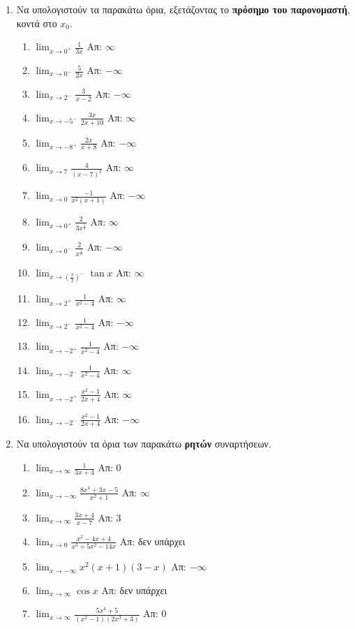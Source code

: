 \begin{enumerate}
  \item Να υπολογιστούν τα παρακάτω όρια, εξετάζοντας το \textbf{πρόσημο του 
    παρονομαστή}, κοντά στο $ x_{0} $.
    \begin{enumerate}
      \item $\lim_{x\to 0^+}\frac{1}{3x}$ \hfill Απ: $\infty$
      \item $\lim_{x\to 0^-}\frac{5}{2x}$ \hfill Απ: $-\infty$
      \item $\lim_{x\to 2^-}\frac{3}{x-2}$ \hfill Απ: $-\infty$
      \item $\lim_{x\to -5^-}\frac{3x}{2x+10}$ \hfill Απ: $\infty$
      \item $\lim_{x\to -8^+}\frac{2x}{x+8}$ \hfill Απ: $-\infty$
      \item $\lim_{x\to 7}\frac{4}{(x-7)^2}$ \hfill Απ: $\infty$
      \item $\lim_{x\to 0}\frac{-1}{x^2(x+1)}$ \hfill Απ: $-\infty$
      \item $\lim_{x\to 0^+}\frac{2}{3x^{\frac{1}{3}}}$ \hfill Απ: $\infty$
      \item $\lim_{x\to 0^-}\frac{2}{x^{\frac{1}{5}}}$ \hfill Απ: $-\infty$
      \item $\lim_{x\to \left(\frac{\pi}{2}\right)^-}\tan x$ \hfill Απ: $\infty$
      \item $\lim_{x\to 2^+}\frac{1}{x^2-4}$ \hfill Απ: $\infty$
      \item $\lim_{x\to 2^-}\frac{1}{x^2-4}$ \hfill Απ: $-\infty$
      \item $\lim_{x\to -2^+}\frac{1}{x^2-4}$ \hfill Απ: $-\infty$
      \item $\lim_{x\to -2^-}\frac{1}{x^2-4}$ \hfill Απ: $\infty$
      \item $\lim_{x\to -2^+}\frac{x^2-1}{2x+4}$ \hfill Απ: $\infty$
      \item $\lim_{x\to -2^-}\frac{x^2-1}{2x+4}$ \hfill Απ: $-\infty$
    \end{enumerate}

  \item Να υπολογιστούν τα όρια των παρακάτω \textbf{ρητών} συναρτήσεων.
    \begin{enumerate}
      \item $\lim_{x\to \infty}\frac{1}{3x+4}$ \hfill Απ: $0$
      \item $\lim_{x\to -\infty}\frac{8x^4+3x-5}{x^2+1}$ \hfill Απ: $\infty$
      \item $\lim_{x\to \infty}\frac{3x+4}{x-7}$ \hfill Απ: $3$
      \item $\lim_{x\to 0}\frac{x^{2}-4x+4}{x^3+5x^2-14x}$ \hfill Απ: δεν υπάρχει
      \item $\lim_{x\to -\infty}x^2(x+1)(3-x)$ \hfill Απ: $-\infty$
      \item $\lim_{x\to \infty}\cos x$ \hfill Απ: δεν υπάρχει
      \item $\lim_{x\to \infty}\frac{5x^4+5}{(x^2-1)(2x^3+3)}$ \hfill Απ: $0$
    \end{enumerate}


\end{enumerate}
